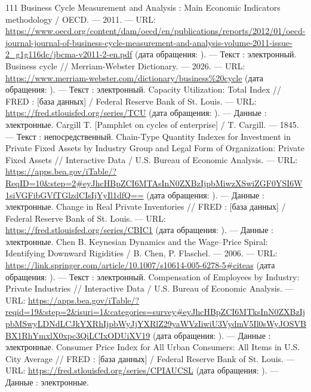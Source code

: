 \begin{RaggedRight}
\begin{thebibliography}{111}
     \hypertarget{bib:OECD-2011}{} Business Cycle Measurement and Analysis : Main Economic Indicators methodology / OECD. --- 2011. --- URL: \url{https://www.oecd.org/content/dam/oecd/en/publications/reports/2012/01/oecd-journal-journal-of-business-cycle-measurement-and-analysis-volume-2011-issue-2_g1g116dc/jbcma-v2011-2-en.pdf} (дата обращения: \bibaccessdate). --- Текст : электронный.
     \hypertarget{bib:Merriam-Webster-2026}{} Business cycle // Merriam-Webster Dictionary. --- 2026. --- URL: \url{https://www.merriam-webster.com/dictionary/business%20cycle} (дата обращения: \bibaccessdate). --- Текст : электронный.
     \hypertarget{bib:FRED-TCU}{} Capacity Utilization: Total Index // FRED : [база данных] / Federal Reserve Bank of St. Louis. --- URL: \url{https://fred.stlouisfed.org/series/TCU} (дата обращения: \bibaccessdate). --- Данные : электронные.
     \hypertarget{bib:Cargill-1845}{} Cargill T. [Pamphlet on cycles of enterprise] / T. Cargill. --- 1845. --- Текст : непосредственный.
     \hypertarget{bib:BEA-6.8}{} Chain-Type Quantity Indexes for Investment in Private Fixed Assets by Industry Group and Legal Form of Organization: Private Fixed Assets // Interactive Data / U.S. Bureau of Economic Analysis. --- URL: \url{https://apps.bea.gov/iTable/?ReqID=10&step=2#eyJhcHBpZCI6MTAsInN0ZXBzIjpbMiwzXSwiZGF0YSI6W1siVGFibGVfTGlzdCIsIjYyIl1dfQ==} (дата обращения: \bibaccessdate). --- Данные : электронные.
     \hypertarget{bib:FRED-CBIC1}{} Change in Real Private Inventories // FRED : [база данных] / Federal Reserve Bank of St. Louis. --- URL: \url{https://fred.stlouisfed.org/series/CBIC1} (дата обращения: \bibaccessdate). --- Данные : электронные.
     \hypertarget{bib:Chen-2006}{} Chen B. Keynesian Dynamics and the Wage--Price Spiral: Identifying Downward Rigidities / B. Chen, P. Flaschel. --- 2006. --- URL: \url{https://link.springer.com/article/10.1007/s10614-005-6278-5#citeas} (дата обращения: \bibaccessdate). --- Текст : электронный.
     \hypertarget{bib:BEA-6.2}{} Compensation of Employees by Industry: Private Industries // Interactive Data / U.S. Bureau of Economic Analysis. --- URL: \url{https://apps.bea.gov/iTable/?reqid=19&step=2&isuri=1&categories=survey#eyJhcHBpZCI6MTksInN0ZXBzIjpbMSwyLDNdLCJkYXRhIjpbWyJjYXRlZ29yaWVzIiwiU3VydmV5Il0sWyJOSVBBX1RhYmxlX0xpc3QiLCIxODUiXV19} (дата обращения: \bibaccessdate). --- Данные : электронные.
     \hypertarget{bib:FRED-CPIAUCSL}{} Consumer Price Index for All Urban Consumers: All Items in U.S. City Average // FRED : [база данных] / Federal Reserve Bank of St. Louis. --- URL: \url{https://fred.stlouisfed.org/series/CPIAUCSL} (дата обращения: \bibaccessdate). --- Данные : электронные.

\end{thebibliography}
\end{RaggedRight}
